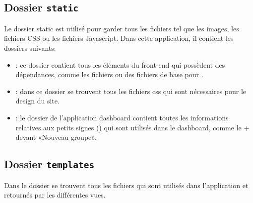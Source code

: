 \documentclass[letterpaper,10pt,french]{sphinxmanual}
\begin{document}
\subsection{Dossier \texttt{static}}
\label{documentation:dossier-static}
Le dossier static est utilisé pour garder tous les fichiers tel que les images,
les fichiers CSS ou les fichiers Javascript.
Dans cette application, il contient les dossiers suivants:
\begin{itemize}
\item {} 
: ce dossier contient tous les éléments du front-end
qui possèdent des dépendances, comme les fichiers  ou des
fichiers de base pour .

\item {} 
: dans ce dossier se trouvent tous les fichiers css qui sont
nécessaires pour le design du site.

\item {} 
: le dossier  de l'application dashboard contient toutes
les informations relatives aux petits signes () qui sont
utilisés dans le dashboard, comme le + devant «Nouveau groupe».

\end{itemize}


\subsection{Dossier \texttt{templates}}
\label{documentation:dossier-templates}
Dans le dossier  se trouvent tous les fichiers  qui sont
utilisés dans l'application et retournés par les différentes vues.
\end{document}
